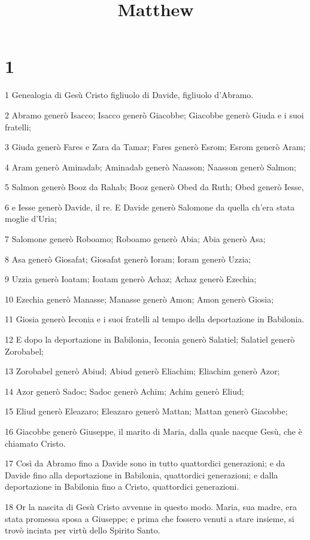 

\title{Matthew}


\chapter{1}

\par 1 Genealogia di Gesù Cristo figliuolo di Davide, figliuolo d'Abramo.
\par 2 Abramo generò Isacco; Isacco generò Giacobbe; Giacobbe generò Giuda e i suoi fratelli;
\par 3 Giuda generò Fares e Zara da Tamar; Fares generò Esrom; Esrom generò Aram;
\par 4 Aram generò Aminadab; Aminadab generò Naasson; Naasson generò Salmon;
\par 5 Salmon generò Booz da Rahab; Booz generò Obed da Ruth; Obed generò Iesse,
\par 6 e Iesse generò Davide, il re. E Davide generò Salomone da quella ch'era stata moglie d'Uria;
\par 7 Salomone generò Roboamo; Roboamo generò Abia; Abia generò Asa;
\par 8 Asa generò Giosafat; Giosafat generò Ioram; Ioram generò Uzzia;
\par 9 Uzzia generò Ioatam; Ioatam generò Achaz; Achaz generò Ezechia;
\par 10 Ezechia generò Manasse; Manasse generò Amon; Amon generò Giosia;
\par 11 Giosia generò Ieconia e i suoi fratelli al tempo della deportazione in Babilonia.
\par 12 E dopo la deportazione in Babilonia, Ieconia generò Salatiel; Salatiel generò Zorobabel;
\par 13 Zorobabel generò Abiud; Abiud generò Eliachim; Eliachim generò Azor;
\par 14 Azor generò Sadoc; Sadoc generò Achim; Achim generò Eliud;
\par 15 Eliud generò Eleazaro; Eleazaro generò Mattan; Mattan generò Giacobbe;
\par 16 Giacobbe generò Giuseppe, il marito di Maria, dalla quale nacque Gesù, che è chiamato Cristo.
\par 17 Così da Abramo fino a Davide sono in tutto quattordici generazioni; e da Davide fino alla deportazione in Babilonia, quattordici generazioni; e dalla deportazione in Babilonia fino a Cristo, quattordici generazioni.
\par 18 Or la nascita di Gesù Cristo avvenne in questo modo. Maria, sua madre, era stata promessa sposa a Giuseppe; e prima che fossero venuti a stare insieme, si trovò incinta per virtù dello Spirito Santo.
